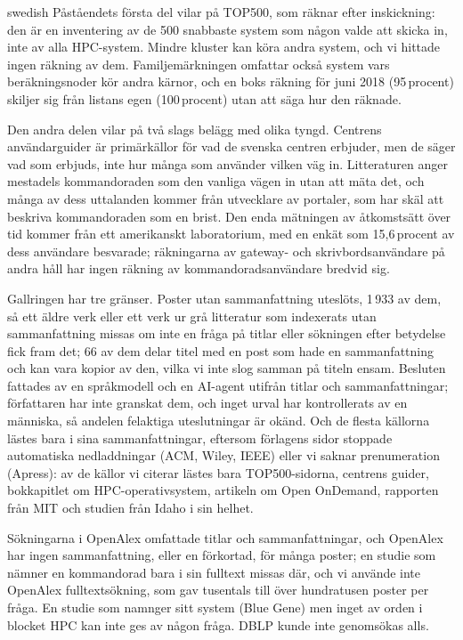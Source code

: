 \begin{onlyin}{swedish}
Påståendets första del vilar på TOP500, som räknar efter inskickning:
den är en inventering av de 500 snabbaste system som någon valde att
skicka in, inte av alla HPC-system.  Mindre kluster kan köra andra
system, och vi hittade ingen räkning av dem.  Familjemärkningen omfattar
också system vars beräkningsnoder kör andra kärnor, och en boks räkning
för juni 2018 (95\,procent) skiljer sig från listans egen (100\,procent)
utan att säga hur den räknade.

Den andra delen vilar på två slags belägg med olika tyngd.  Centrens
användarguider är primärkällor för vad de svenska centren erbjuder, men
de säger vad som erbjuds, inte hur många som använder vilken väg in.
Litteraturen anger mestadels kommandoraden som den vanliga vägen in utan
att mäta det, och många av dess uttalanden kommer från utvecklare av
portaler, som har skäl att beskriva kommandoraden som en brist.  Den enda
mätningen av åtkomstsätt över tid kommer från ett amerikanskt
laboratorium, med en enkät som 15,6\,procent av dess användare besvarade;
räkningarna av gateway- och skrivbordsanvändare på andra håll har ingen
räkning av kommandoradsanvändare bredvid sig.

Gallringen har tre gränser.  Poster utan sammanfattning uteslöts, 1\,933
av dem, så ett äldre verk eller ett verk ur grå litteratur som
indexerats utan sammanfattning missas om inte en fråga på titlar eller
sökningen efter betydelse fick fram det; 66 av dem delar titel med en
post som hade en sammanfattning och kan vara kopior av den, vilka vi inte
slog samman på titeln ensam.  Besluten fattades av en språkmodell och en
AI-agent utifrån titlar och sammanfattningar; författaren har inte
granskat dem, och inget urval har kontrollerats av en människa, så
andelen felaktiga uteslutningar är okänd.  Och de flesta källorna lästes
bara i sina sammanfattningar, eftersom förlagens sidor stoppade
automatiska nedladdningar (ACM, Wiley, IEEE) eller vi saknar prenumeration
(Apress): av de källor vi citerar lästes bara TOP500-sidorna, centrens
guider, bokkapitlet om HPC-operativsystem, artikeln om Open OnDemand,
rapporten från MIT och studien från Idaho i sin helhet.

Sökningarna i OpenAlex omfattade titlar och sammanfattningar, och
OpenAlex har ingen sammanfattning, eller en förkortad, för många poster;
en studie som nämner en kommandorad bara i sin fulltext missas där, och
vi använde inte OpenAlex fulltextsökning, som gav tusentals till över
hundratusen poster per fråga.  En studie som namnger sitt system (Blue
Gene) men inget av orden i blocket HPC kan inte ges av någon fråga.  DBLP
kunde inte genomsökas alls.
\end{onlyin}

